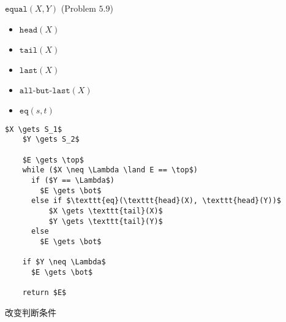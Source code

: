
\begin{frame}{}
  \begin{exampleblock}{$\texttt{equal}(X,Y)$ (Problem $5.9$)}
    \begin{itemize}
      \item $\texttt{head}(X)$
      \item $\texttt{tail}(X)$
      \item $\texttt{last}(X)$
      \item $\texttt{all-but-last}(X)$
      \item $\texttt{eq}(s,t)$
    \end{itemize}
  \end{exampleblock}
\end{frame}

\begin{frame}[fragile]{}
  \begin{lstlisting}[style = CStyle]
    $X \gets S_1$
    $Y \gets S_2$

    $E \gets \top$
    while ($X \neq \Lambda \land E == \top$)
      if ($Y == \Lambda$)
        $E \gets \bot$
      else if $\texttt{eq}(\texttt{head}(X), \texttt{head}(Y))$
          $X \gets \texttt{tail}(X)$
          $Y \gets \texttt{tail}(Y)$
      else
        $E \gets \bot$

    if $Y \neq \Lambda$
      $E \gets \bot$

    return $E$
  \end{lstlisting}
\end{frame}

\begin{frame}[fragile]{}
  改变判断条件
\end{frame}
